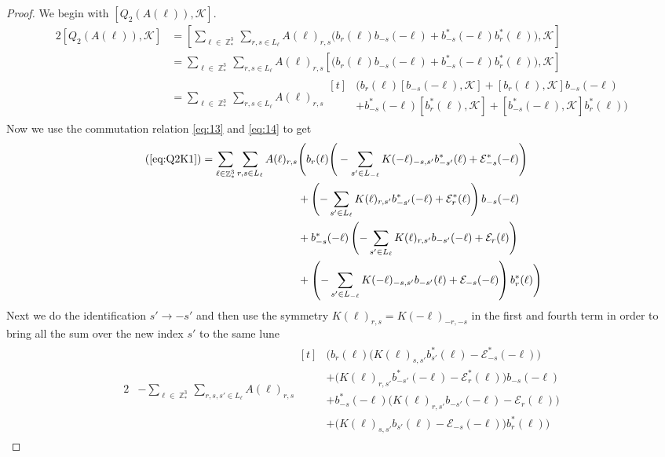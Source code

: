 \documentclass[sn-mathphys,Numbered, a4paper ,nocrop]{sn-jnl}%
\DeclareMathOperator{\Z}{\mathbb{Z}}
\theoremstyle{plain}
\theoremstyle{definition}
\theoremstyle{remark}
\theoremstyle{plain}
\theoremstyle{definition}
\theoremstyle{remark}
\begin{document}
\begin{proof}
We begin with $[ Q_2(A(\ell)),\mathcal{K}]$.
\begin{alignat}{2}
    [Q_2(A(\ell)),\mathcal{K}] &= \left[\sum\limits_{\ell \in \Z^3_*}\sum\limits_{r,s \in L_{\ell}}A(\ell)_{r,s}\Big(b_{r}(\ell)b_{-s}(-\ell) + b^*_{-s}(-\ell)b^*_{r}(\ell)\Big),\mathcal{K}\right]\\
    &= \sum\limits_{\ell \in \Z^3_*}\sum\limits_{r,s \in L_{\ell}}A(\ell)_{r,s}\left[\Big(b_{r}(\ell)b_{-s}(-\ell) + b^*_{-s}(-\ell)b^*_{r}(\ell)\Big),\mathcal{K}\right]\\
    &= \sum\limits_{\ell \in \Z^3_*}\sum\limits_{r,s \in L_{\ell}}A(\ell)_{r,s}\begin{aligned}[t]
        &\Big(b_{r}(\ell)[b_{-s}(-\ell),\mathcal{K}] + [b_{r}(\ell),\mathcal{K}]b_{-s}(-\ell)\\&+ b^*_{-s}(-\ell)[b^*_{r}(\ell),\mathcal{K}] + [b^*_{-s}(-\ell),\mathcal{K}]b^*_{r}(\ell) \Big)
    \end{aligned}\label{eq:Q2K1}
\end{alignat}
Now we use the commutation relation \eqref{eq:13} and \eqref{eq:14} to get
\begin{equation}
    (\ref{eq:Q2K1})=\sum\limits_{\ell \in \Z^3_*}\sum\limits_{r,s \in L_{\ell}}A(\ell)_{r,s}\begin{aligned}[t]
        &\Bigg(b_{r}(\ell)\Bigg(-\sum\limits_{s'\in L_{-\ell}}K(-\ell)_{-s,s'}b^*_{-s'}(\ell) + \mathcal{E}^*_{-s}(-\ell)\Bigg)\\ &+ \left(-\sum\limits_{s'\in L_{\ell}}K(\ell)_{r,s'}b^*_{-s'}(-\ell) + \mathcal{E}^*_{r}(\ell)\right)b_{-s}(-\ell)\\&+ b^*_{-s}(-\ell)\left(-\sum\limits_{s'\in L_{\ell}}K(\ell)_{r,s'}b_{-s'}(-\ell) + \mathcal{E}_{r}(\ell)\right)\\ &+ \left(-\sum\limits_{s'\in L_{-\ell}}K(-\ell)_{-s,s'}b_{-s'}(\ell) + \mathcal{E}_{-s}(-\ell)\right)b^*_{r}(\ell) \Bigg)
    \end{aligned}
\end{equation}
Next we do the identification $s'\rightarrow -s'$ and then use the symmetry $K(\ell)_{r,s} = K(-\ell)_{-r,-s}$ in the first and fourth term in order to bring all the sum over the new index $s'$ to the same lune
\begin{alignat}{2}
    &-\sum\limits_{\ell \in \Z^3_*}\sum\limits_{r,s,s' \in L_{\ell}}A(\ell)_{r,s}\begin{aligned}[t]
        &\Bigg(b_{r}(\ell)\Big(K(\ell)_{s,s'}b^*_{s'}(\ell) - \mathcal{E}^*_{-s}(-\ell)\Big)\\ &+ \Big(K(\ell)_{r,s'}b^*_{-s'}(-\ell) - \mathcal{E}^*_{r}(\ell)\Big)b_{-s}(-\ell)\\&+ b^*_{-s}(-\ell)\Big(K(\ell)_{r,s'}b_{-s'}(-\ell) - \mathcal{E}_{r}(\ell)\Big)\\ &+ \Big(K(\ell)_{s,s'}b_{s'}(\ell) - \mathcal{E}_{-s}(-\ell)\Big)b^*_{r}(\ell) \Bigg)

\end{aligned}
\end{alignat}
\end{proof}
\end{document}
